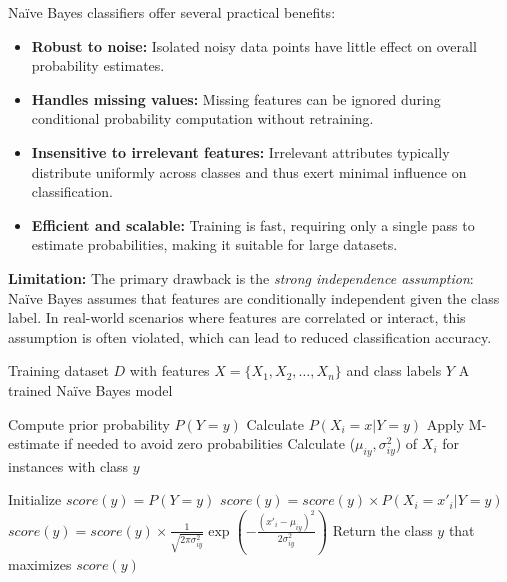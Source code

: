 Na\"ive Bayes classifiers offer several practical benefits:

\begin{itemize}
    \item \textbf{Robust to noise:} Isolated noisy data points have little effect on overall probability estimates.
    \item \textbf{Handles missing values:} Missing features can be ignored during conditional probability computation without retraining.
    \item \textbf{Insensitive to irrelevant features:} Irrelevant attributes typically distribute uniformly across classes and thus exert minimal influence on classification.
    \item \textbf{Efficient and scalable:} Training is fast, requiring only a single pass to estimate probabilities, making it suitable for large datasets.
\end{itemize}

\textbf{Limitation:}  
The primary drawback is the \textit{strong independence assumption}: Na\"ive Bayes assumes that features are conditionally independent given the class label. In real-world scenarios where features are correlated or interact, this assumption is often violated, which can lead to reduced classification accuracy.

\begin{algorithm}
\caption{Na\"ive Bayes Classifier Training and Prediction}
\begin{algorithmic}[1]
\Require Training dataset $D$ with features $X = \{X_1, X_2, \ldots, X_n\}$ and class labels $Y$
\Ensure A trained Na\"ive Bayes model

 
    \State Compute prior probability $P(Y = y)$
                \State Calculate $P(X_i = x | Y = y)$ 
                \State Apply M-estimate if needed to avoid zero probabilities
            \EndFor
            \State Calculate ($\mu_{iy},\sigma^2_{iy}$) of $X_i$ for instances with class $y$
        \EndIf
    \EndFor
\EndFor

  
    \State Initialize $score(y) = P(Y = y)$
            \State $score(y) = score(y) \times P(X_i = x'_i | Y = y)$
            \State $score(y) = score(y) \times \frac{1}{\sqrt{2\pi\sigma^2_{iy}}} \exp\left(-\frac{(x'_i-\mu_{iy})^2}{2\sigma^2_{iy}}\right)$
        \EndIf
    \EndFor
\EndFor
\State Return the class $y$ that maximizes $score(y)$
\end{algorithmic}
\end{algorithm}


